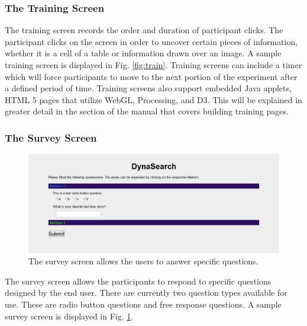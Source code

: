 \documentclass[article]{ij4uq}              %
\begin{document}
\subsubsection{The Training Screen}

The training screen records the order and duration of participant clicks. The participant clicks on the screen in order to uncover certain pieces of information, whether it is a cell of a table or information drawn over an image. A sample training screen is displayed in Fig. \ref{fig:train}.  Training screens can include a timer which will force participants to move to the next portion of the experiment after a defined period of time.  Training screens also support embedded Java applets, HTML 5 pages that utilize WebGL, Processing, and D3.  This will be explained in greater detail in the section of the manual that covers building training pages.

\subsubsection{The Survey Screen}

\begin{figure}[h!]
 \centering
 \includegraphics[width=5.0in]{figures/survey_page.png}
 \caption{The survey screen allows the users to answer specific questions.}
 \label{fig:survey}
\end{figure}
\FloatBarrier

The survey screen allows the participants to respond to specific questions designed by the end user. There are currently two question types available for use.  These are radio button questions and free response questions. A sample survey screen is displayed in Fig. \ref{fig:survey}.



\end{document}
